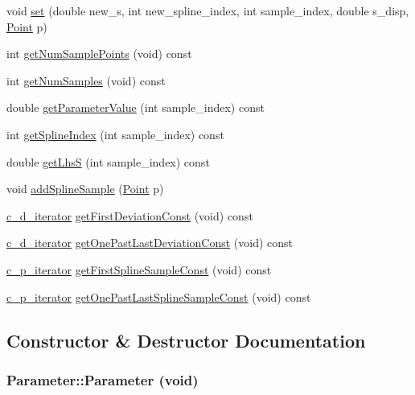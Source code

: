 \begin{CompactItemize}
\item 
void \hyperlink{classParameter_d0a92d44cf3746bfae006c5761b862d1}{set} (double new\_\-s, int new\_\-spline\_\-index, int sample\_\-index, double s\_\-disp, \hyperlink{classPoint}{Point} p)
\item 
int \hyperlink{classParameter_e6a494adb7a970b6d9a1d6c242f600e6}{getNumSamplePoints} (void) const 
\item 
int \hyperlink{classParameter_51f0d8dc2f9c7c113be49351118902e2}{getNumSamples} (void) const 
\item 
double \hyperlink{classParameter_2f0b21ed83fb3a11305ee733a34317b2}{getParameterValue} (int sample\_\-index) const 
\item 
int \hyperlink{classParameter_3f630390b0346479113e758df49ad21d}{getSplineIndex} (int sample\_\-index) const 
\item 
double \hyperlink{classParameter_b918e85afbde855a65c0b82cb3484308}{getLhsS} (int sample\_\-index) const 
\item 
void \hyperlink{classParameter_52053a1e39332eab88503c5328343d7f}{addSplineSample} (\hyperlink{classPoint}{Point} p)
\item 
\hyperlink{parameter_8h_76617663fb8c2b14cf698a47a4d07926}{c\_\-d\_\-iterator} \hyperlink{classParameter_69d4f2f72a57ac999196a1b7d3417286}{getFirstDeviationConst} (void) const 
\item 
\hyperlink{parameter_8h_76617663fb8c2b14cf698a47a4d07926}{c\_\-d\_\-iterator} \hyperlink{classParameter_fc243c9ebaef7c8711859696d8c5a1a4}{getOnePastLastDeviationConst} (void) const 
\item 
\hyperlink{parameter_8h_d367c52cb5a031e4bc21ba9af7d6ee47}{c\_\-p\_\-iterator} \hyperlink{classParameter_7006d1d623467ddf4c94724503ee77d5}{getFirstSplineSampleConst} (void) const 
\item 
\hyperlink{parameter_8h_d367c52cb5a031e4bc21ba9af7d6ee47}{c\_\-p\_\-iterator} \hyperlink{classParameter_bab72e16fa4732267560e6b0b661fb8b}{getOnePastLastSplineSampleConst} (void) const 
\end{CompactItemize}


\subsection{Constructor \& Destructor Documentation}
\hypertarget{classParameter_b1939f6d4bacbd505ead9dfafcd2647f}{
\subsubsection[Parameter]{\setlength{\rightskip}{0pt plus 5cm}Parameter::Parameter (void)}}
\label{classParameter_b1939f6d4bacbd505ead9dfafcd2647f}




